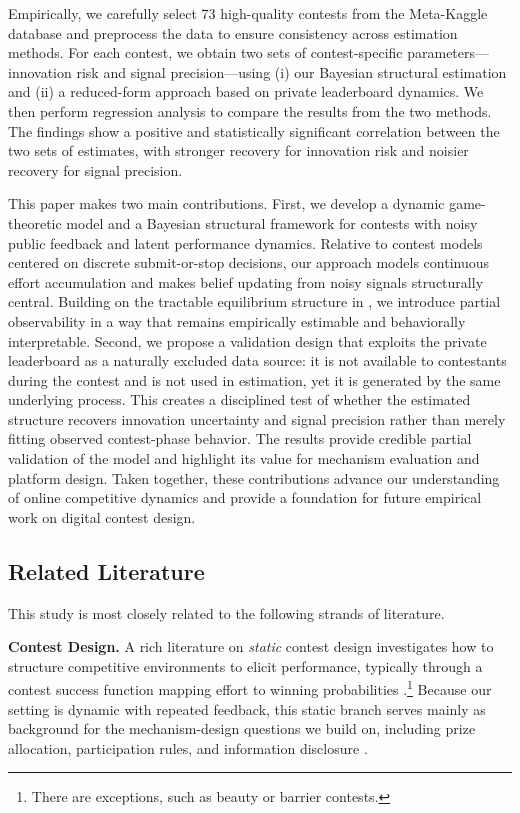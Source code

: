 \documentclass[mnsc]{informs3}
\begin{document}
Empirically, we carefully select 73 high-quality contests from the Meta-Kaggle database and preprocess the data to ensure consistency across estimation methods.
For each contest, we obtain two sets of contest-specific parameters—innovation risk and signal precision—using (i) our Bayesian structural estimation and (ii) a reduced-form approach based on private leaderboard dynamics.
We then perform regression analysis to compare the results from the two methods.
The findings show a positive and statistically significant correlation between the two sets of estimates, with stronger recovery for innovation risk and noisier recovery for signal precision.


This paper makes two main contributions.
First, we develop a dynamic game-theoretic model and a Bayesian structural framework for contests with noisy public feedback and latent performance dynamics.
Relative to contest models centered on discrete submit-or-stop decisions, our approach models continuous effort accumulation and makes belief updating from noisy signals structurally central.
Building on the tractable equilibrium structure in \citet{Ryvkin2022Fight}, we introduce partial observability in a way that remains empirically estimable and behaviorally interpretable.
Second, we propose a validation design that exploits the private leaderboard as a naturally excluded data source: it is not available to contestants during the contest and is not used in estimation, yet it is generated by the same underlying process.
This creates a disciplined test of whether the estimated structure recovers innovation uncertainty and signal precision rather than merely fitting observed contest-phase behavior.
The results provide credible partial validation of the model and highlight its value for mechanism evaluation and platform design.
Taken together, these contributions advance our understanding of online competitive dynamics and provide a foundation for future empirical work on digital contest design.



\subsection{Related Literature}

This study is most closely related to the following strands of literature.

\textbf{Contest Design.}
A rich literature on \textit{static} contest design \citep{ales2017optimal_award} investigates how to structure competitive environments to elicit performance, typically through a contest success function mapping effort to winning probabilities \citep{skaperdas1996contest}.\footnote{There are exceptions, such as beauty or barrier contests.}
Because our setting is dynamic with repeated feedback, this static branch serves mainly as background for the mechanism-design questions we build on, including prize allocation, participation rules, and information disclosure \citep{moldovanu2001optimal, ales2021number_of_players, bergemann2022optimal}.
\end{document}
